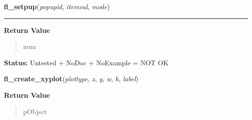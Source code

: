     \vspace{0.5ex}

\hspace{.8\funcindent}\begin{boxedminipage}{\funcwidth}

    \raggedright \textbf{fl\_setpup}(\textit{popupid}, \textit{itemval}, \textit{mode})

    \vspace{-1.5ex}

    \rule{\textwidth}{0.5\fboxrule}
\setlength{\parskip}{2ex}
\setlength{\parskip}{1ex}
      \textbf{Return Value}
    \vspace{-1ex}

      \begin{quote}
      num

      \end{quote}

\textbf{Status:} Untested + NoDoc + NoExample = NOT OK



    \end{boxedminipage}

    \label{xformslib:library:fl_create_xyplot}

    \vspace{0.5ex}

\hspace{.8\funcindent}\begin{boxedminipage}{\funcwidth}

    \raggedright \textbf{fl\_create\_xyplot}(\textit{plottype}, \textit{x}, \textit{y}, \textit{w}, \textit{h}, \textit{label})

\setlength{\parskip}{2ex}
\setlength{\parskip}{1ex}
      \textbf{Return Value}
    \vspace{-1ex}

      \begin{quote}
      pObject

      \end{quote}

    \end{boxedminipage}

    \label{xformslib:library:fl_add_xyplot}

    \vspace{0.5ex}

